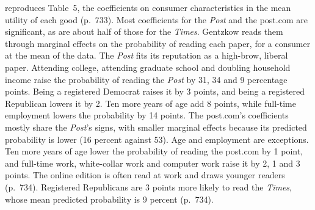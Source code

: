   reproduces Table~5, the coefficients on consumer characteristics in
the mean utility of each good (p.~733). Most coefficients for the \textit{Post} and the post.com are significant, as
are about half of those for the \textit{Times}. Gentzkow reads them through marginal effects on the probability of
reading each paper, for a consumer at the mean of the data. The \textit{Post} fits its reputation as a high-brow,
liberal paper. Attending college, attending graduate school and doubling household income raise the probability of
reading the \textit{Post} by 31, 34 and 9 percentage points. Being a registered Democrat raises it by 3 points, and being a registered Republican
lowers it by 2. Ten more years of age add 8 points, while full-time employment lowers the probability by 14 points.
The post.com's coefficients mostly share the \textit{Post}'s signs, with smaller marginal effects because its predicted
probability is lower (16 percent against 53). Age and employment are exceptions. Ten more years of age lower the
probability of reading the post.com by 1 point, and full-time work, white-collar work and computer work raise it by 2,
1 and 3 points. The online edition is often read at work and draws younger readers (p.~734). Registered
Republicans are 3 points more likely to read the \textit{Times}, whose mean predicted probability is 9 percent (p.~734).

